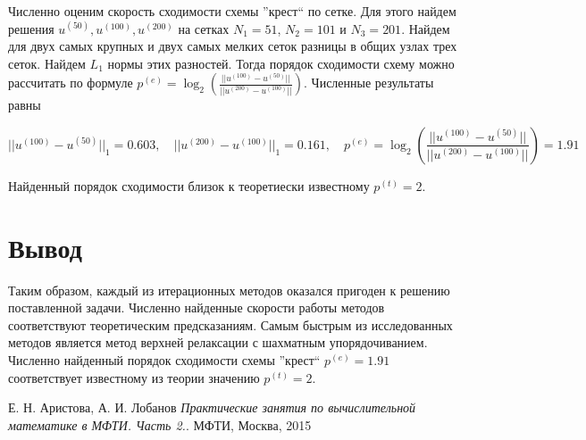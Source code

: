 \documentclass[report , a4paper, onecolumn, 12pt]{article}
\begin{document}
Численно оценим скорость сходимости схемы ''крест`` по сетке. Для этого найдем решения $u^{(50)}, u^{(100)}, u^{(200)}$ на сетках  $N_1 = 51$, $N_2 = 101$ и $N_3 = 201$. Найдем для двух самых крупных и двух самых мелких сеток разницы в общих узлах трех сеток.  Найдем $L_1$ нормы этих разностей. Тогда порядок сходимости схему можно рассчитать по формуле $ p^{(e)}=\log_2\left(\frac{||u^{(100)}-u^{(50)}||}{||u^{(200)} - u^{(100)}||}\right)$. Численные результаты равны

\begin{equation}
 ||u^{(100)} - u^{(50)}||_1 = 0.603, \quad  ||u^{(200)} - u^{(100)}||_1 = 0.161, \quad p^{(e)}=\log_2\left(\frac{||u^{(100)}-u^{(50)}||}{||u^{(200)} - u^{(100)}||}\right)=1.91
\end{equation}

Найденный порядок сходимости близок к теоретиески известному $p^{(t)} = 2$.

\section{Вывод}

Таким образом, каждый из итерационных методов оказался пригоден к решению поставленной задачи. Численно найденные скорости работы методов соответствуют теоретическим предсказаниям. Самым быстрым из исследованных методов является метод верхней релаксации с шахматным упорядочиванием. Численно найденный порядок сходимости схемы ''крест`` $p^{(e)}=1.91$ соответствует известному из теории значению $p^{(t)}=2$.


\begin{thebibliography}{9}
Е. Н. Аристова, А. И. Лобанов
\textit{Практические занятия по вычислительной математике в МФТИ. Часть 2.}. 
МФТИ, Москва, 2015

\end{thebibliography}
\end{document}
